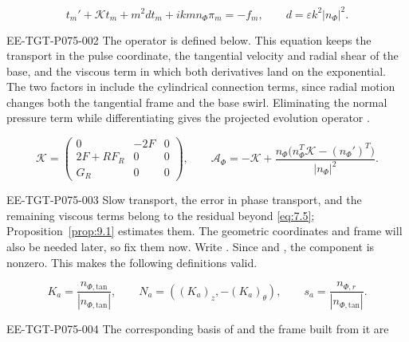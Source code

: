 \begin{equation}
t_m'+\mathcal Kt_m+m^2dt_m+ikmn_\Phi\pi_m=-f_m,
\qquad d=\varepsilon k^2|n_\Phi|^2.
\tag{7.5}\label{eq:7.5}
\end{equation}
\begin{EESegment}{EE-TGT-P075-002}
The operator  is defined below. This equation keeps the transport in the pulse coordinate, the tangential velocity and radial shear of the base, and the viscous term in which both derivatives land on the exponential. The two factors  in  include the cylindrical connection terms, since radial motion changes both the tangential frame and the base swirl. Eliminating the normal pressure term while differentiating  gives the projected evolution operator .
\end{EESegment}
\begin{equation}
\mathcal K=
\begin{pmatrix}
0&-2F&0\\
2F+RF_R&0&0\\
G_R&0&0
\end{pmatrix},
\qquad
\mathcal A_\Phi=-\mathcal K+
\frac{n_\Phi\bigl(n_\Phi^T\mathcal K-(n_\Phi')^T\bigr)}{|n_\Phi|^2}.
\tag{7.6}\label{eq:7.6}
\end{equation}
\begin{EESegment}{EE-TGT-P075-003}
Slow transport, the error in phase transport, and the remaining viscous terms belong to the residual beyond \eqref{eq:7.5}; Proposition~\ref{prop:9.1} estimates them. The geometric coordinates and frame will also be needed later, so fix them now. Write . Since  and , the component  is nonzero. This makes the following definitions valid.
\end{EESegment}
\begin{equation}
K_a=\frac{n_{\Phi,\mathrm{tan}}}{|n_{\Phi,\mathrm{tan}}|},\qquad
N_a=((K_a)_z,-(K_a)_\theta),\qquad
s_a=\frac{n_{\Phi,r}}{|n_{\Phi,\mathrm{tan}}|}.
\tag{7.7}\label{eq:7.7}
\end{equation}
\begin{EESegment}{EE-TGT-P075-004}
The corresponding basis of  and the frame built from it are
\end{EESegment}
